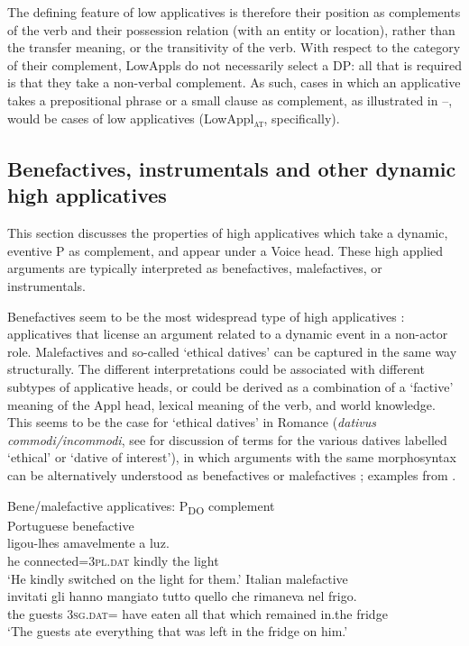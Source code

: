 \documentclass[output=paper,colorlinks,citecolor=brown,modfonts,nonflat]{langsci/langscibook}
\begin{document}
The defining feature of low applicatives is therefore their position as complements of the verb and their possession relation (with an entity or location), rather than the transfer meaning, or the transitivity of the verb. With respect to the category of their complement, LowAppls do not necessarily select a DP: all that is required is that they take a non-verbal complement. As such, cases in which an applicative takes a prepositional phrase or a small clause as complement, as illustrated in --, would be cases of low applicatives (LowAppl\textsc{\textsubscript{at}}, specifically).

\subsection{Benefactives, instrumentals and other dynamic high applicatives}\label{sec:cuervo:4.2}

This section discusses the properties of high applicatives which take a dynamic, eventive {\liv}P as complement, and appear under a Voice head. These high applied arguments are typically interpreted as benefactives, malefactives, or instrumentals.

Benefactives seem to be the most widespread type of high applicatives \citep{Polinsky2013}: applicatives that license an argument related to a dynamic event in a non-actor role. Malefactives and so-called ‘ethical datives’ can be captured in the same way structurally. The different interpretations could be associated with different subtypes of applicative heads, or could be derived as a combination of a ‘factive’ meaning of the Appl head, lexical meaning of the verb, and world knowledge. This seems to be the case for ‘ethical datives’ in Romance (\textit{dativus commodi/incommodi}, see \citealt{RobergeTroberg2009} for discussion of terms for the various datives labelled ‘ethical’ or ‘dative of interest’), in which arguments with the same morphosyntax can be alternatively understood as benefactives  or malefactives ; examples from \citealt{RobergeTroberg2009}.


\ea%
    \label{ex:cuervo:9}
    Bene/malefactive applicatives: {\liv}P\textsubscript{DO} complement\\
    \ea%
        \label{ex:cuervo:9a}
        Portuguese benefactive\\
         {ligou-lhes}   {amavelmente} {a} {luz}.\\
        he   connected=\textsc{3pl.dat} kindly   the light\\
        \glt ‘He kindly switched on the light for them.’
    \ex%
        \label{ex:cuervo:9b}
        Italian malefactive\\
         {invitati} {gli} {hanno} {mangiato} {tutto} {quello} {che} {rimaneva} {nel} {frigo}.\\
         the guests 3\textsc{sg.dat}= have eaten all that which remained in.the fridge\\
        \glt ‘The guests ate everything that was left in the fridge on him.’
    \z
\z
\end{document}
